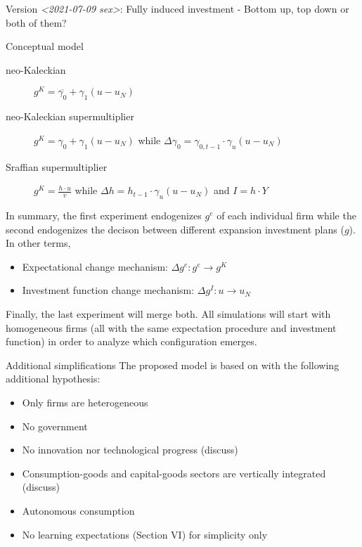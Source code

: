 \documentclass[presentation]{beamer}
\begin{document}
\begin{frame}[label={sec:org790494c}]{Version \textit{<2021-07-09 sex>}: Fully induced investment - Bottom up, top down or both of them?}
\begin{block}{Conceptual model}
\begin{description}
\item[{neo-Kaleckian}] \(g^{K} = \overline{\gamma_{0}} + \gamma_{1} (u - u_{N})\)
\item[{neo-Kaleckian supermultiplier}] \(g^{K} = \gamma_{0} + \gamma_{1}(u - u_{N})\) while \(\Delta \gamma_{0} = \gamma_{0,t-1}\cdot\gamma_{u} (u - u_{N})\)
\item[{Sraffian supermultiplier}] \(g^{K} = \frac{h\cdot u}{v}\) while \(\Delta h = h_{t-1}\cdot \gamma_{u} (u - u_{N})\) and \(I = h\cdot Y\)
\end{description}


In summary, the first experiment endogenizes \(g^{e}\) of each individual firm while the second endogenizes the decison between different expansion investment plans (\(g\)).
In other terms,

\begin{itemize}
\item Expectational change mechanism: \(\Delta g^{e}: g^{e} \to g^{K}\)
\item Investment function change mechanism: \(\Delta g^{I}: u \to u_{N}\)
\end{itemize}

Finally, the last experiment will merge both.
All simulations will start with homogeneous firms (all with the same expectation procedure and investment function) in order to analyze which configuration emerges.

\begin{block}{Additional simplifications}
The proposed model is based on \textcite{dosi_2020_RATIONAL} with the following additional hypothesis:
\begin{itemize}
\item Only firms are heterogeneous
\item No government
\item No innovation nor technological progress (discuss)
\item Consumption-goods and capital-goods sectors are vertically integrated (discuss)
\item Autonomous consumption
\item No learning expectations (Section VI) for simplicity only
\end{itemize}
\end{block}
\end{block}
\end{frame}
\end{document}

